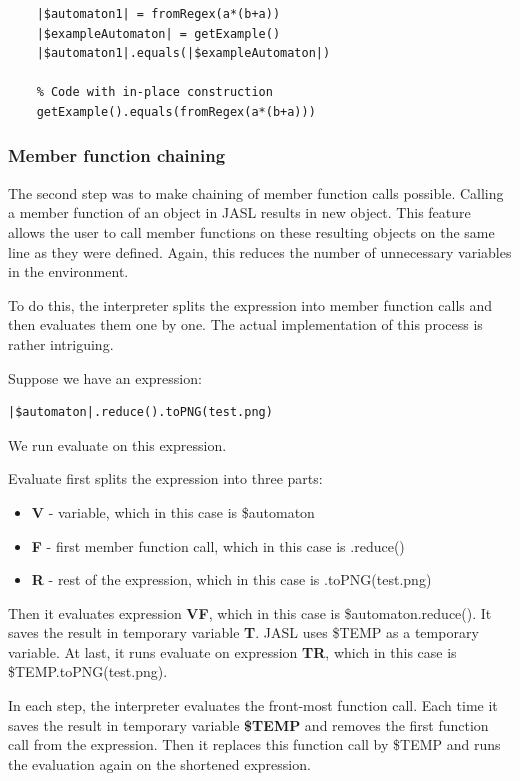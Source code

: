 \documentclass{ctuthesis}
\begin{document}
\begin{minipage}{\linewidth}
\begin{lstlisting}[language = JASL]
	% Code without in-place construction
	|$automaton1| = fromRegex(a*(b+a))
	|$exampleAutomaton| = getExample()
	|$automaton1|.equals(|$exampleAutomaton|)
	
	% Code with in-place construction
	getExample().equals(fromRegex(a*(b+a)))
\end{lstlisting}
\end{minipage}

\subsubsection{Member function chaining}
\label{chaining_impl}
The second step was to make chaining of member function calls possible. Calling a member function of an object in JASL results in new object. This feature allows the user to call member functions on these resulting objects on the same line as they were defined. Again, this reduces the number of unnecessary variables in the environment.

To do this, the interpreter splits the expression into member function calls and then evaluates them one by one. The actual implementation of this process is rather intriguing. 

Suppose we have an expression:
\begin{lstlisting}[language = JASL_snippet]
	|$automaton|.reduce().toPNG(test.png)
\end{lstlisting}
We run evaluate on this expression.

Evaluate first splits the expression into three parts:
\begin{itemize}
	\item \textbf{V} - variable, which in this case is \$automaton
	\item \textbf{F} - first member function call, which in this case is .reduce()
	\item \textbf{R} - rest of the expression, which in this case is .toPNG(test.png)
\end{itemize}

Then it evaluates expression \textbf{VF}, which in this case is \$automaton.reduce(). It saves the result in temporary variable \textbf{T}. 	
JASL uses \$TEMP as a temporary variable. At last, it runs evaluate on expression \textbf{TR}, which in this case is \$TEMP.toPNG(test.png).

In each step, the interpreter evaluates the front-most function call. Each time it saves the result in temporary variable \textbf{\$TEMP} and removes the first function call from the expression. Then it replaces this function call by \$TEMP and runs the evaluation again on the shortened expression. 
\end{document}
